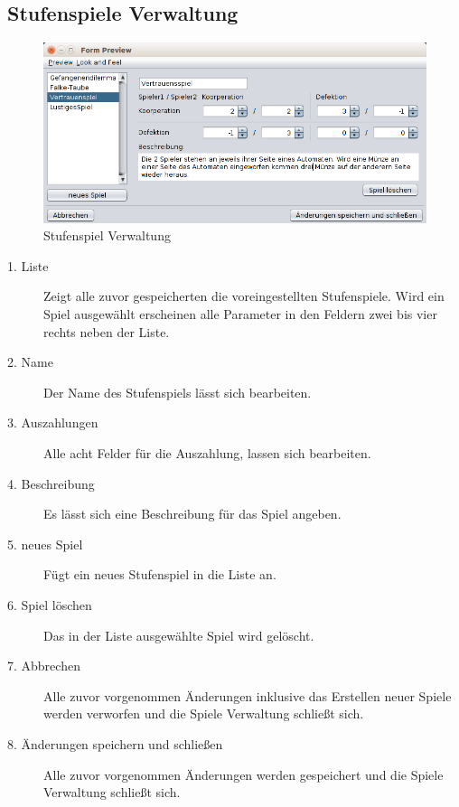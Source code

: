 \pagebreak

\subsection{Stufenspiele Verwaltung}

\begin{figure}[hp] 
  \centering
     \includegraphics[width=1.1\textwidth]{GUI_Entwurf/SpieleMenue.png}
  \caption{Stufenspiel Verwaltung}
  \label{fig:Bild1}
\end{figure}

\begin{description}

\item[1. Liste] Zeigt alle zuvor gespeicherten die voreingestellten Stufenspiele. Wird ein Spiel ausgewählt erscheinen alle Parameter in den Feldern zwei bis vier rechts neben der Liste.

\item[2. Name] Der Name des Stufenspiels lässt sich bearbeiten.

\item[3. Auszahlungen] Alle acht Felder für die Auszahlung, lassen sich bearbeiten.

\item[4. Beschreibung] Es lässt sich eine Beschreibung für das Spiel angeben.

\item[5. neues Spiel] Fügt ein neues Stufenspiel in die Liste an. 

\item[6. Spiel löschen] Das in der Liste ausgewählte Spiel wird gelöscht.

\item[7. Abbrechen] Alle zuvor vorgenommen Änderungen inklusive das Erstellen neuer Spiele werden verworfen und die Spiele Verwaltung schließt sich.

\item[8. Änderungen speichern und schließen] Alle zuvor vorgenommen Änderungen werden gespeichert und die Spiele Verwaltung schließt sich.

\end{description}

